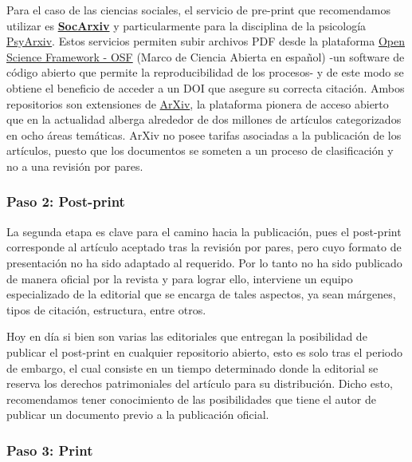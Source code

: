 \documentclass[
  spanish,
  letterpaper,
  DIV=11,
  numbers=noendperiod]{scrreprt}
\begin{document}
Para el caso de las ciencias sociales, el servicio de pre-print que
recomendamos utilizar es \href{https://socopen.org/}{\textbf{SocArxiv}}
y particularmente para la disciplina de la psicología
\href{https://psyarxiv.com/}{PsyArxiv}. Estos servicios permiten subir
archivos PDF desde la plataforma
\href{https://help.osf.io/hc/en-us/categories/360001530554-Preprints}{Open
Science Framework - OSF} (Marco de Ciencia Abierta en español) -un
software de código abierto que permite la reproducibilidad de los
procesos- y de este modo se obtiene el beneficio de acceder a un DOI que
asegure su correcta citación. Ambos repositorios son extensiones de
\href{https://arxiv.org/}{ArXiv}, la plataforma pionera de acceso
abierto que en la actualidad alberga alrededor de dos millones de
artículos categorizados en ocho áreas temáticas. ArXiv no posee tarifas
asociadas a la publicación de los artículos, puesto que los documentos
se someten a un proceso de clasificación y no a una revisión por pares.

\subsubsection*{Paso 2: Post-print}\label{paso-2-post-print}

La segunda etapa es clave para el camino hacia la publicación, pues el
post-print corresponde al artículo aceptado tras la revisión por pares,
pero cuyo formato de presentación no ha sido adaptado al requerido. Por
lo tanto no ha sido publicado de manera oficial por la revista y para
lograr ello, interviene un equipo especializado de la editorial que se
encarga de tales aspectos, ya sean márgenes, tipos de citación,
estructura, entre otros.

Hoy en día si bien son varias las editoriales que entregan la
posibilidad de publicar el post-print en cualquier repositorio abierto,
esto es solo tras el periodo de embargo, el cual consiste en un tiempo
determinado donde la editorial se reserva los derechos patrimoniales del
artículo para su distribución. Dicho esto, recomendamos tener
conocimiento de las posibilidades que tiene el autor de publicar un
documento previo a la publicación oficial.

\subsubsection*{Paso 3: Print}\label{paso-3-print}
\end{document}
